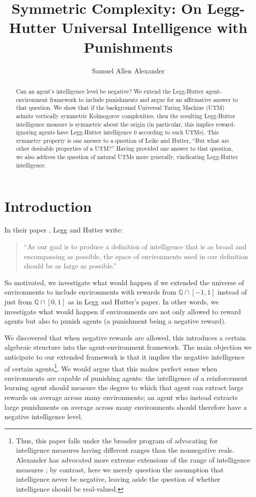 \documentclass{article}
\title{Symmetric Complexity: On Legg-Hutter Universal Intelligence with Punishments}
\author{Samuel Allen Alexander}
\begin{document}
\maketitle

\begin{abstract}
    Can an agent's intelligence level be negative?
    We extend the Legg-Hutter agent-environment framework to include punishments
    and argue for an affirmative answer to that question.
    We show that if the background Universal Turing Machine (UTM) admits
    vertically symmetric Kolmogorov complexities,
    then the resulting Legg-Hutter intelligence measure is symmetric about
    the origin (in particular, this implies reward-ignoring agents
    have Legg-Hutter intelligence $0$ according to such UTMs). This
    symmetry property is one answer to a question of Leike and Hutter,
    ``But what are other desirable properties of a UTM?'' Having provided one
    answer to that question, we also address the question of natural UTMs
    more generally, vindicating Legg-Hutter intelligence.
\end{abstract}

\section{Introduction}

In their paper \cite{legg2007universal}, Legg and Hutter write:
\begin{quote}
    ``As our goal is to produce a definition of intelligence that is as broad and
    encompassing as possible, the space of environments used in our definition should
    be as large as possible.''
\end{quote}
So motivated, we investigate what would happen if we extended the universe
of environments to include environments with rewards from $\mathbb Q\cap [-1,1]$
instead of just from $\mathbb Q\cap [0,1]$ as in Legg and Hutter's paper.
In other words, we investigate what would happen if environments are not only
allowed to reward agents but also to punish agents (a punishment being a negative
reward).

We discovered that when negative rewards are allowed, this
introduces a certain algebraic structure into the agent-environment framework. The
main objection we anticipate to our extended framework
is that it implies the negative intelligence of certain
agents\footnote{Thus, this paper falls under the broader
program of advocating for intelligence measures having different ranges than
the nonnegative reals. Alexander has advocated
more extreme extensions of the range of intelligence measures
\cite{alexander2020archimedean} \cite{alexander2021measuring}; by contrast,
here we merely question the
assumption that intelligence never be negative, leaving aside the
question of whether intelligence should be real-valued.}.
We would argue that this makes perfect sense when environments are capable of punishing
agents: the intelligence of a reinforcement learning agent should measure the
degree to which that agent can extract large rewards on average across many environments;
an agent who instead extracts large punishments on average across many environments
should therefore have a negative intelligence level.
\end{document}
